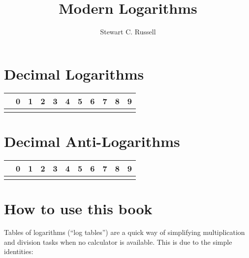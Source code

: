 \documentclass[twoside,a4paper]{article}
\title{Modern Logarithms}
\author{Stewart C. Russell}
\begin{document}
\maketitle
\tableofcontents

\newpage
\thispagestyle{empty}
\section{Decimal Logarithms}
\newpage


\makeatletter
\def\@oddhead{\thepage\qquad\textsc{Decimal Logarithms}\hfill \rightmark{} -- \leftmark}
\def\@evenhead{\rightmark{} -- \leftmark \hfill \textsc{Decimal Logarithms}\qquad\thepage}
\makeatother

\begin{longtable}[c]{|*{11}{c|}}
 & \textbf{0} & \textbf{1} & \textbf{2} & \textbf{3} & \textbf{4} & \textbf{5} & \textbf{6} & \textbf{7} & \textbf{8} & \textbf{9} \\
\hline \endhead
\hline \endfoot

\end{longtable}

\newpage
\thispagestyle{empty}
\section{Decimal Anti-Logarithms}
\newpage

\makeatletter
\def\@oddhead{\thepage\qquad\textsc{Decimal Anti-Logarithms}\hfill \rightmark{} -- \leftmark}
\def\@evenhead{\rightmark{} -- \leftmark\hfill \textsc{Decimal Anti-Logarithms}\qquad\thepage}
\makeatother

\begin{longtable}[c]{|*{11}{c|}}
 & \textbf{0} & \textbf{1} & \textbf{2} & \textbf{3} & \textbf{4} & \textbf{5} & \textbf{6} & \textbf{7} & \textbf{8} & \textbf{9} \\
\hline \endhead
\hline \endfoot

\end{longtable}

\newpage
\markboth{}{}
\makeatletter
\def\@oddhead{\thepage \hfill \rightmark{} \leftmark}
\def\@evenhead{\rightmark{} \leftmark\hfill \thepage}
\makeatother

\section{How to use this book}

Tables of logarithms (``log tables'') are a quick way of simplifying
multiplication and division tasks when no calculator is available. This is due to the simple identities:
\end{document}
